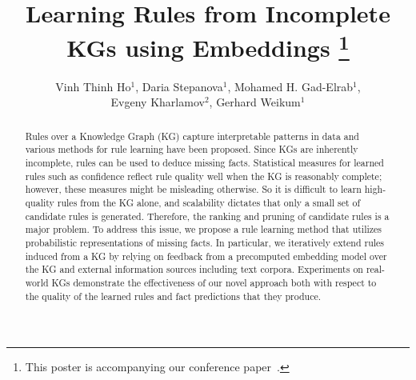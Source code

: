 \documentclass{llncs}
\begin{document}
%
\frontmatter          %
%
\pagestyle{headings}  %

\mainmatter              %
%
\title{
\hspace{-2ex}Learning Rules from Incomplete KGs using Embeddings%
\thanks{This poster is accompanying our conference paper~\cite{iswc-18}.}
}
%
\titlerunning{}  %

\newcommand{\authspace}{\hspace{1.5ex}}
\author{%
Vinh Thinh Ho$^{1}$,
Daria Stepanova$^{1}$,
Mohamed H. Gad-Elrab$^{1}$,\\
Evgeny Kharlamov$^{2}$,
Gerhard Weikum$^{1}$
}		

\maketitle              %


\begin{abstract}

Rules over a Knowledge Graph (KG) capture interpretable patterns in data and various methods for rule learning have been proposed. Since KGs are inherently incomplete, rules can be used to deduce missing facts. Statistical measures for learned rules such as confidence reflect rule quality well when the KG is reasonably complete; however, these measures might be misleading otherwise. So it is difficult to learn high-quality rules from the KG alone, and scalability dictates that only a small set of candidate rules is generated. Therefore, the ranking and pruning of candidate rules is a major problem. To address this issue, we propose a rule learning method that utilizes probabilistic representations of missing facts. In particular, we iteratively extend rules induced from a KG by relying on feedback from a precomputed embedding model over the KG and external information sources including text corpora. Experiments on real-world KGs demonstrate the effectiveness of our novel approach both with respect to the quality of the learned rules and fact predictions that they produce.
\end{abstract}
\end{document}
